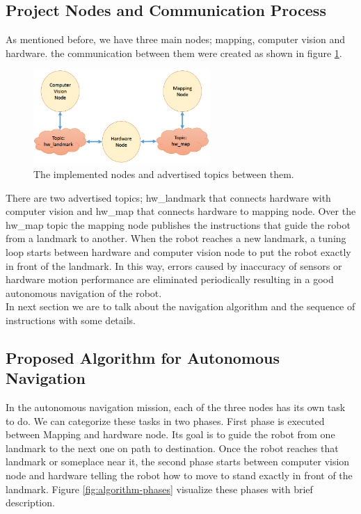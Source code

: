 \documentclass[12pt]{article}
\begin{document}
\subsection{Project Nodes and Communication Process}
As mentioned before, we have three main nodes; mapping, computer vision and hardware. the communication between them were created as shown in figure \ref{fig:nodes}. 
\begin{figure}[H]
	\centering
	\includegraphics[width =0.6\textwidth]{Fig/Project-Nodes.png}
	\caption{The implemented nodes and advertised topics between them.}
	\label{fig:nodes}
\end{figure}
\noindent There are two advertised topics; hw\_landmark that connects hardware with computer vision and hw\_map that connects hardware to mapping node. Over the hw\_map topic the mapping node publishes the instructions that guide the robot from a landmark to another. When the robot reaches a new landmark, a tuning loop starts between hardware and computer vision node to put the robot exactly in front of the landmark. In this way, errors caused by inaccuracy of sensors or hardware motion performance are eliminated periodically resulting in a good autonomous navigation of the robot.\\
In next section we are to talk about the navigation algorithm and the sequence of instructions with some details.  




\subsection{Proposed Algorithm for Autonomous Navigation}
In the autonomous navigation mission, each of the three nodes has its own task to do. We can categorize these tasks in two phases. First phase is executed between Mapping and hardware node. Its goal is to guide the robot from one landmark to the next one on path to destination. Once the robot reaches that landmark or someplace near it, the second phase starts between computer vision node and hardware telling the robot how to move to stand exactly in front of the landmark. Figure \ref{fig:algorithm-phases} visualize these phases with brief description.
\end{document}
